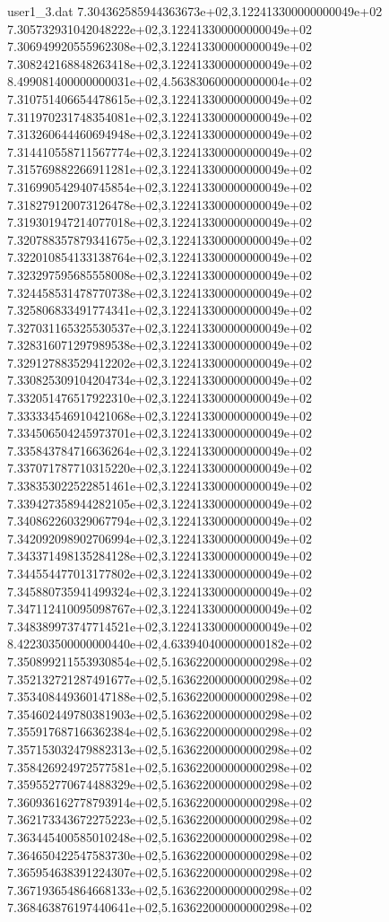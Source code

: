 \begin{filecontents}{user1_3.dat}
7.304362585944363673e+02,3.122413300000000049e+02
7.305732931042048222e+02,3.122413300000000049e+02
7.306949920555962308e+02,3.122413300000000049e+02
7.308242168848263418e+02,3.122413300000000049e+02
8.499081400000000031e+02,4.563830600000000004e+02
7.310751406654478615e+02,3.122413300000000049e+02
7.311970231748354081e+02,3.122413300000000049e+02
7.313260644460694948e+02,3.122413300000000049e+02
7.314410558711567774e+02,3.122413300000000049e+02
7.315769882266911281e+02,3.122413300000000049e+02
7.316990542940745854e+02,3.122413300000000049e+02
7.318279120073126478e+02,3.122413300000000049e+02
7.319301947214077018e+02,3.122413300000000049e+02
7.320788357879341675e+02,3.122413300000000049e+02
7.322010854133138764e+02,3.122413300000000049e+02
7.323297595685558008e+02,3.122413300000000049e+02
7.324458531478770738e+02,3.122413300000000049e+02
7.325806833491774341e+02,3.122413300000000049e+02
7.327031165325530537e+02,3.122413300000000049e+02
7.328316071297989538e+02,3.122413300000000049e+02
7.329127883529412202e+02,3.122413300000000049e+02
7.330825309104204734e+02,3.122413300000000049e+02
7.332051476517922310e+02,3.122413300000000049e+02
7.333334546910421068e+02,3.122413300000000049e+02
7.334506504245973701e+02,3.122413300000000049e+02
7.335843784716636264e+02,3.122413300000000049e+02
7.337071787710315220e+02,3.122413300000000049e+02
7.338353022522851461e+02,3.122413300000000049e+02
7.339427358944282105e+02,3.122413300000000049e+02
7.340862260329067794e+02,3.122413300000000049e+02
7.342092098902706994e+02,3.122413300000000049e+02
7.343371498135284128e+02,3.122413300000000049e+02
7.344554477013177802e+02,3.122413300000000049e+02
7.345880735941499324e+02,3.122413300000000049e+02
7.347112410095098767e+02,3.122413300000000049e+02
7.348389973747714521e+02,3.122413300000000049e+02
8.422303500000000440e+02,4.633940400000000182e+02
7.350899211553930854e+02,5.163622000000000298e+02
7.352132721287491677e+02,5.163622000000000298e+02
7.353408449360147188e+02,5.163622000000000298e+02
7.354602449780381903e+02,5.163622000000000298e+02
7.355917687166362384e+02,5.163622000000000298e+02
7.357153032479882313e+02,5.163622000000000298e+02
7.358426924972577581e+02,5.163622000000000298e+02
7.359552770674488329e+02,5.163622000000000298e+02
7.360936162778793914e+02,5.163622000000000298e+02
7.362173343672275223e+02,5.163622000000000298e+02
7.363445400585010248e+02,5.163622000000000298e+02
7.364650422547583730e+02,5.163622000000000298e+02
7.365954638391224307e+02,5.163622000000000298e+02
7.367193654864668133e+02,5.163622000000000298e+02
7.368463876197440641e+02,5.163622000000000298e+02

\end{filecontents}
